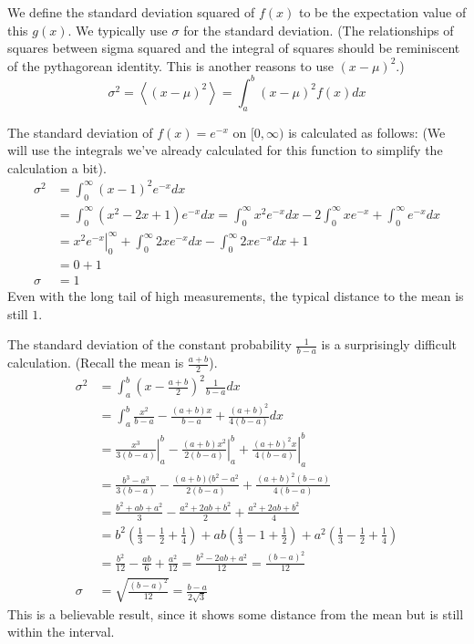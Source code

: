 \documentclass[fleqn]{report}
\begin{document}
\begin{defn}
We define the standard deviation squared of $f(x)$ to
be the expectation value of this $g(x)$. We typically use
$\sigma$ for the standard deviation. (The relationships of
squares between sigma squared and the integral of squares
should be reminiscent of the pythagorean identity. This is
another reasons to use $(x-\mu)^2$.)
\begin{equation*}
\sigma^2 = \left< (x-\mu)^2 \right> = \int_a^b (x-\mu)^2 f(x) dx 
\end{equation*}
\end{defn}

\begin{example}
The standard deviation of $f(x) = e^{-x}$ on $[0 , \infty)$ is
calculated as follows: (We will use the integrals we've already
calculated for this function to simplify the calculation a
bit).
\begin{align*}
\sigma^2 & = \int_0^\infty \left( x - 1 \right)^2
e^{-x} dx \\
& = \int_0^\infty \left( x^2 - 2x +
1 \right) e^{-x} dx 
= \int_0^\infty x^2 e^{-x} dx - 2 \int_0^\infty
xe^{-x} + \int_0^\infty e^{-x} dx
\\
& = \left. x^2 e^{-x}
\right|_0^\infty + \int_0^\infty 2 x e^{-x} dx -
\int_0^\infty 2 x e^{-x} dx + 1\\
& = 0 + 1\\
\sigma & = 1
\end{align*}
Even with the long tail of high measurements, the typical
distance to the mean is still $1$.
\end{example}

\begin{example}
The standard deviation of the constant probability 
$\frac{1}{b-a}$ is a surprisingly difficult calculation.
(Recall the mean is $\frac{a+b}{2}$). 
\begin{align*}
\sigma^2 & = \int_a^b \left( x - \frac{a+b}{2} \right)^2
\frac{1}{b-a} dx \\
& = \int_a^b \frac{x^2}{b-a} - \frac{(a+b)x}{b-a} +
\frac{(a+b)^2}{4(b-a)} dx \\
& = \left. \frac{x^3}{3(b-a)} \right|_a^b - \left.
\frac{(a+b)x^2}{2(b-a)} \right|_a^b + \left.
\frac{(a+b)^2x}{4(b-a)} \right|_a^b \\
& = \frac{b^3-a^3}{3(b-a)} - \frac{(a+b)(b^2-a^2}{2(b-a)} +
\frac{(a+b)^2(b-a)}{4(b-a)} \\
& = \frac{b^2 + ab + a^2}{3} - \frac{a^2 + 2ab+ b^2}{2} +
\frac{a^2 + 2ab + b^2}{4} \\
& = b^2 \left( \frac{1}{3} - \frac{1}{2} + \frac{1}{4} \right) +
ab \left( \frac{1}{3} - 1 + \frac{1}{2} \right) + a^2 \left(
\frac{1}{3} - \frac{1}{2} + \frac{1}{4} \right) \\
& = \frac{b^2}{12} - \frac{ab}{6} + \frac{a^2}{12} =
\frac{b^2-2ab+a^2}{12} = \frac{(b-a)^2}{12} \\
\sigma & = \sqrt{ \frac{(b-a)^2}{12}} = \frac{b-a}{2\sqrt{3}}
\end{align*}
This is a believable result, since it shows some distance from
the mean but is still within the interval.
\end{example}
\end{document}
